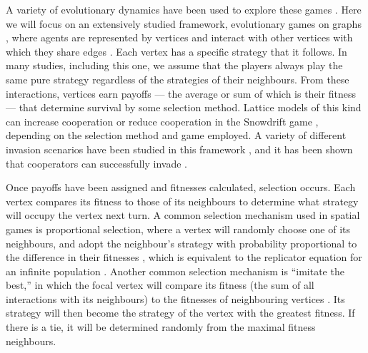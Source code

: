 \documentclass[reprint,aps,pre,twocolumn]{revtex4-1}
\begin{document}
A variety of evolutionary dynamics have been used to explore these games \cite{lehmann06,perc10}. Here we will focus on an extensively studied framework, evolutionary games on graphs \cite{nowak10,roca09,szabo07}, where agents are represented by vertices and interact with other vertices with which they share edges \cite{hauert01, nowak92}. Each vertex has a specific strategy that it follows. In many studies, including this one, we assume that the players always play the same pure strategy regardless of the strategies of their neighbours. From these interactions, vertices earn payoffs --- the average or sum of which is their fitness --- that determine survival by some selection method. Lattice models of this kind can increase cooperation \cite{killingback96} or reduce cooperation in the Snowdrift game \cite{hauert04}, depending on the selection method and game employed. A variety of different invasion scenarios have been studied in this framework \cite{fu10}, and it has been shown that cooperators can successfully invade \cite{langer08}.

Once payoffs have been assigned and fitnesses calculated, selection occurs. Each vertex compares its fitness to those of its neighbours to determine what strategy will occupy the vertex next turn. A common selection mechanism used in spatial games is proportional selection, where a vertex will randomly choose one of its neighbours, and adopt the neighbour's strategy with probability proportional to the difference in their fitnesses \cite{buesser12}, which is equivalent to the replicator equation for an infinite population \cite{helbing92}. Another common selection mechanism is ``imitate the best,'' in which the focal vertex will compare its fitness (the sum of all interactions with its neighbours) to the fitnesses of neighbouring vertices \cite{hauert01}. Its strategy will then become the strategy of the vertex with the greatest fitness. If there is a tie, it will be determined randomly from the maximal fitness neighbours.
\end{document}
